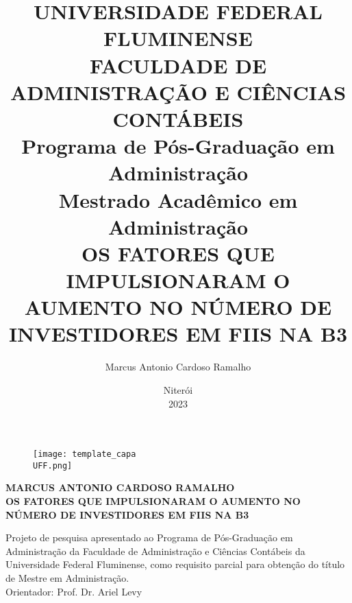 \documentclass{article}
\title{\textbf{\fontsize{12}{14}\selectfont 
UNIVERSIDADE FEDERAL FLUMINENSE\\[0.2cm]
FACULDADE DE ADMINISTRAÇÃO E CIÊNCIAS CONTÁBEIS\\[0.2cm]
Programa de Pós-Graduação em Administração\\[0.2cm]
Mestrado Acadêmico em Administração\\[4.5cm]
OS FATORES QUE IMPULSIONARAM O AUMENTO NO NÚMERO DE INVESTIDORES EM FIIS NA B3\\[4cm]
}}
\author{Marcus Antonio Cardoso Ramalho}
\date{\vspace{4cm}Niterói\\[0.2cm]2023}
\begin{document}
\begin{figure}
\centering
\texttt{[image: template\_capa\\UFF.png]}\\[-1.5cm]
\end{figure}
\maketitle



\begin{center}
\textbf{MARCUS ANTONIO CARDOSO RAMALHO\\[2cm]
OS FATORES QUE IMPULSIONARAM O AUMENTO NO NÚMERO DE INVESTIDORES EM FIIS NA B3\\[7cm]}
\end{center}

\justify
\setlength{\leftskip}{8cm}

Projeto de pesquisa apresentado ao Programa de Pós-Graduação em Administração da Faculdade de Administração e Ciências Contábeis da Universidade Federal Fluminense, como requisito parcial para obtenção do título de Mestre em Administração.\\[2cm]
Orientador: Prof. Dr. Ariel Levy
\end{document}
